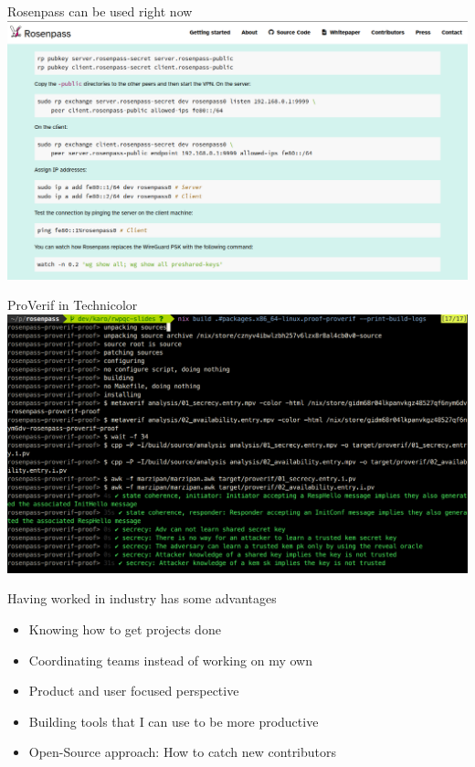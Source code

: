 \documentclass{rosenpass-beamer}
\begin{document}
  

\begin{frame}{Rosenpass can be used right now}
  \includegraphics[height=.9\textheight]{assets/2023-03-20-rg-tutorial-screenshot.png}
\end{frame}

\begin{frame}{ProVerif in Technicolor}
  \includegraphics[height=.9\textheight]{assets/2023-03-20-symbolic-analysis-screenshot.png}
\end{frame}

\begin{frame}{Having worked in industry has some advantages}
\begin{itemize}
  \item Knowing how to get projects done
  \item Coordinating teams instead of working on my own
  \item Product and user focused perspective
  \item Building tools that I can use to be more productive
  \item Open-Source approach: How to catch new contributors
\end{itemize}
\end{frame}
\end{document}

